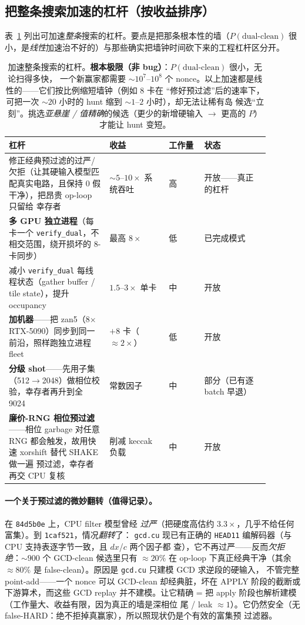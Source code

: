 \documentclass[11pt]{ctexart}
\let\c\lstinline
\begin{document}
\subsection{把整条搜索加速的杠杆（按收益排序）}
表~\ref{tab:levers} 列出可加速\emph{整条}搜索的杠杆。要点是把那条根本性的墙（$P(\text{dual-clean})$
很小，是\emph{线性}加速治不好的）与那些确实把墙钟时间砍下来的工程杠杆区分开。
\begin{table}[h]\centering\small
\begin{tabular}{@{}p{0.34\linewidth}p{0.20\linewidth}p{0.12\linewidth}p{0.22\linewidth}@{}}
\toprule
杠杆 & 收益 & 工作量 & 状态 \\ \midrule
修正经典预过滤的过严/欠拒（让其硬输入模型匹配真实电路，且保持 $0$ 假干净），把昂贵 op-loop 只留给
幸存者 & $\sim 5$--$10\times$ 系统吞吐 & 高 & 开放——真正的杠杆 \\
\textbf{多 GPU 独立进程}（每卡一个 \c{verify_dual}，不相交范围，绕开损坏的 8-卡同步） & 最高 $8\times$ &
低 & 已完成模式 \\
减小 \c{verify_dual} 每线程状态（gather buffer / tile state），提升 occupancy & $1.5$--$3\times$
单卡 & 中 & 开放 \\
\textbf{加机器}——把 zan5（8$\times$RTX-5090）同步到同一前沿，照样跑独立进程 fleet & $+8$ 卡（$\approx
2\times$） & 低 & 开放 \\
\textbf{分级 shot}——先用子集（512$\to$2048）做相位校验，幸存者再升到全 9024 & 常数因子 & 中 &
部分（已有逐 batch 早退） \\
\textbf{廉价-RNG 相位预过滤}——相位 garbage 对任意 RNG 都会触发，故用快速 xorshift 替代 SHAKE 做一遍
预过滤，幸存者再交 CPU 复核 & 削减 keccak 负载 & 中 & 开放 \\
\bottomrule
\end{tabular}
\caption{加速整条搜索的杠杆。\textbf{根本极限（非 bug）}：$P(\text{dual-clean})$ 很小，无论扫得多快，
一个新赢家都需要 $\sim 10^7$--$10^8$ 个 nonce。以上加速都是线性的——它们按比例缩短墙钟（例如 8 卡在
``修好预过滤''后的速率下，可把一次 $\sim 20$ 小时的 hunt 缩到 $\sim 1$--$2$ 小时），却无法让稀有岛
候选``立刻''。挑选\emph{亚悬崖 / 值精确}的候选（更少的新增硬输入 $\to$ 更高的 $P$）才能让 hunt 变短。}
\label{tab:levers}
\end{table}

\paragraph{一个关于预过滤的微妙翻转（值得记录）。}在 \texttt{84d5b0e} 上，CPU filter 模型曾经
\emph{过严}（把硬度高估约 $3.3\times$，几乎不给任何富集）。到 \texttt{1caf521}，情况\emph{翻转}了：
\c{gcd.cu} 现已有正确的 \texttt{HEAD11} 编解码器（与 CPU 支持表逐字节一致，且 $dx$/$c$ 两个因子都
查），它不再过严——反而\emph{欠拒绝}：$\sim 900$ 个 GCD-clean 候选里只有 $\approx 20\%$ 在 op-loop
下真正经典干净（其余 $\approx 80\%$ 是 false-clean）。原因是 \c{gcd.cu} 只建模 GCD 求逆段的硬输入，
不管完整 point-add——一个 nonce 可以 GCD-clean 却经典脏，坏在 APPLY 阶段的截断或下游算术，而这些
GCD replay 并不建模。让它精确 = 把 apply 阶段也解析建模（工作量大、收益有限，因为真正的墙是深相位
尾 / leak $\approx 1$）。它仍然安全（无 false-HARD：绝不拒掉真赢家），所以照现状仍是个有效的富集预
过滤器。
\end{document}
